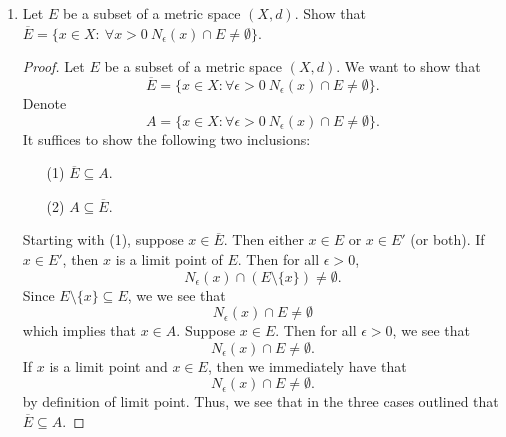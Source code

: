 \documentclass[a4paper]{article}
\begin{document}
\begin{enumerate}
\begin{proof}
\begin{enumerate}
               \[  \Big(  \bigcap_{ \alpha }^{  } {F}_{\alpha} \Big)^{c} \ \text{is open} \Longleftrightarrow \bigcap_{ \alpha }^{  }  {F}_{\alpha} \ \text{is closed}  \]
               and we are done.
            \item[(2)] Let \( \{ {F}_{i} : 1 \leq i \leq n  \}  \) be a finite collection of closed sets \( {F}_{i} \). We want to show that \( \bigcup_{ i=1 }^{ n } {F}_{i} \) is a closed set. It suffices to show that the complement of this set, that is \( \Big(  \bigcup_{ i=1 }^{ n } {F}_{i} \Big)^{c} \) is open. Observe that
                \[ \Big(  \bigcup_{ i=1 }^{ n } {F}_{i} \Big)^{c} = \bigcap_{ i=1 }^{ n } {F}_{i}^{c}.  \]
                Note that each \( {F}_{i}^{c} \) is open if and only if each \( {F}_{i} \) is closed. Thus, the finite intersection of each open set \( {F}_{i}^{c}  \) is open; that is,
                \[ \Big(  \bigcup_{ i=1 }^{ n } {F}_{i} \Big)^{c} = \bigcap_{ i=1 }^{ n } {F}_{i}^{c} \ \text{is open}.  \]
                Hence, the finite union of closed sets
                \[  \bigcup_{ i=1 }^{ n } {F}_{i} \ \text{is closed}. \]
        \end{enumerate}
        \end{proof}
    \item Let \( E  \) be a subset of a metric space \( (X,d ) \). Show that \( \overline{E} = \{ x \in X : \ \forall x > 0 \ {N}_{\epsilon}(x) \cap E \neq \emptyset \}  \).
    \begin{proof}
        Let \( E  \) be a subset of a metric space \( (X,d) \). We want to show that 
        \[ \overline{E} =\{  x \in X : \forall   \epsilon > 0 \ {N}_{\epsilon}(x) \cap E \neq \emptyset \}.  \] 
        Denote 
        \[  A = \{  x \in X : \forall  \epsilon > 0 \ {N}_{\epsilon}(x) \cap E \neq \emptyset \}.   \]
        It suffices to show the following two inclusions:
        \begin{enumerate}
            \item[(1)] \( \overline{E} \subseteq A \).
            \item[(2)] \( A \subseteq \overline{E} \).
        \end{enumerate}
        Starting with (1), suppose \( x \in \overline{E} \). Then either \( x \in E  \) or \( x \in E' \) (or both). If \( x \in E'  \), then \( x  \) is a limit point of \( E  \). Then for all \( \epsilon > 0  \),
        \[  {N}_{\epsilon}(x) \cap (E \setminus  \{ x \} )   \neq \emptyset. \]
        Since \( E \setminus  \{ x \} \subseteq E  \), we we see that 
        \[  {N}_{\epsilon}(x) \cap E \neq \emptyset \]
        which implies that \( x \in A \). Suppose \( x \in E  \). Then for all \( \epsilon > 0 \), we see that  
        \[  {N}_{\epsilon}(x) \cap E \neq \emptyset. \]
        If \( x  \) is a limit point and \( x \in E  \), then we immediately have that 
        \[  {N}_{\epsilon}(x) \cap E \neq \emptyset.  \]
        by definition of limit point. Thus, we see that in the three cases outlined that \( \overline{E} \subseteq A  \).
       

\end{proof}
\end{enumerate}
\end{document}
